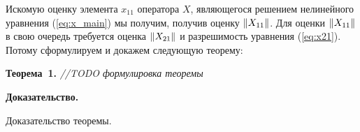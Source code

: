 Искомую оценку элемента $x_{11}$ оператора $X$, являющегося решением нелинейного уравнения (\ref{eq:x_main}) мы получим, получив оценку $\left\|X_{11}\right\|$. Для оценки $\left\|X_{11}\right\|$ в свою очередь требуется оценка $\left\|X_{21}\right\|$ и разрешимость уравнения (\ref{eq:x21}). Потому сформулируем и докажем следующую теорему:

\noindent\textbf{Теорема~1.}
{ \it //TODO формулировка теоремы}

\noindent\textbf{Доказательство.}

Доказательство теоремы.
\hfill

